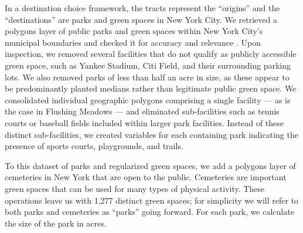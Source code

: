 \documentclass[shortAfour,sageh.bst]{sagej}
\begin{document}
In a destination choice framework, the tracts represent the ``origins''
and the ``destinations'' are parks and green spaces in New York City. We
retrieved a polygons layer of public parks and green spaces within New
York City's municipal boundaries and checked it for accuracy and
relevance \citep{nycparks}. Upon inspection, we removed several
facilities that do not qualify as publicly accessible green space, such
as Yankee Stadium, Citi Field, and their surrounding parking lots. We
also removed parks of less than half an acre in size, as these appear to
be predominantly planted medians rather than legitimate public green
space. We consolidated individual geographic polygons comprising a
single facility --- as is the case in Flushing Meadows --- and
eliminated sub-facilities such as tennis courts or baseball fields
included within larger park facilities. Instead of these distinct
sub-facilities, we created variables for each containing park indicating
the presence of sports courts, playgrounds, and trails.

To this dataset of parks and regularized green spaces, we add a polygons
layer of cemeteries in New York that are open to the public. Cemeteries
are important green spaces that can be used for many types of physical
activity. These operations leave us with 1,277 distinct green spaces;
for simplicity we will refer to both parks and cemeteries as ``parks''
going forward. For each park, we calculate the size of the park in
acres.
\end{document}
